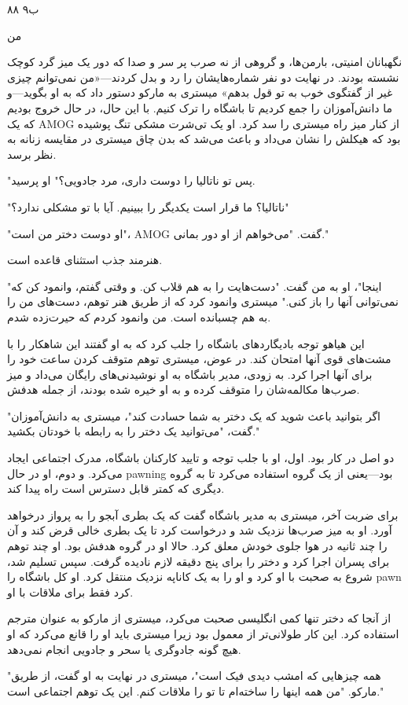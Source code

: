 ۸۸ ب۹

من

نگهبانان امنیتی، بارمن‌ها، و گروهی از نه صرب پر سر و صدا که دور یک میز گرد کوچک نشسته بودند. در نهایت دو نفر شماره‌هایشان را رد و بدل کردند—«من نمی‌توانم چیزی غیر از گفتگوی خوب به تو قول بدهم» میستری به مارکو دستور داد که به او بگوید—و ما دانش‌آموزان را جمع کردیم تا باشگاه را ترک کنیم. با این حال، در حال خروج بودیم که یک AMOG از کنار میز راه میستری را سد کرد. او یک تی‌شرت مشکی تنگ پوشیده بود که هیکلش را نشان می‌داد و باعث می‌شد که بدن چاق میستری در مقایسه زنانه به نظر برسد.

"پس تو ناتالیا را دوست داری، مرد جادویی؟" او پرسید.

"ناتالیا؟ ما قرار است یکدیگر را ببینیم. آیا با تو مشکلی ندارد؟"

"او دوست دختر من است"، AMOG گفت. "می‌خواهم از او دور بمانی."

هنرمند جذب استثنای قاعده است.

"اینجا"، او به من گفت. "دست‌هایت را به هم قلاب کن. و وقتی گفتم، وانمود کن که نمی‌توانی آنها را باز کنی." میستری وانمود کرد که از طریق هنر توهم، دست‌های من را به هم چسبانده است. من وانمود کردم که حیرت‌زده شدم.

این هیاهو توجه بادیگاردهای باشگاه را جلب کرد که به او گفتند این شاهکار را با مشت‌های قوی آنها امتحان کند. در عوض، میستری توهم متوقف کردن ساعت خود را برای آنها اجرا کرد. به زودی، مدیر باشگاه به او نوشیدنی‌های رایگان می‌داد و میز صرب‌ها مکالمه‌شان را متوقف کرده و به او خیره شده بودند، از جمله هدفش.

"اگر بتوانید باعث شوید که یک دختر به شما حسادت کند"، میستری به دانش‌آموزان گفت، "می‌توانید یک دختر را به رابطه با خودتان بکشید."

دو اصل در کار بود. اول، او با جلب توجه و تایید کارکنان باشگاه، مدرک اجتماعی ایجاد می‌کرد. و دوم، او در حال pawning بود—یعنی از یک گروه استفاده می‌کرد تا به گروه دیگری که کمتر قابل دسترس است راه پیدا کند.

برای ضربت آخر، میستری به مدیر باشگاه گفت که یک بطری آبجو را به پرواز درخواهد آورد. او به میز صرب‌ها نزدیک شد و درخواست کرد تا یک بطری خالی قرض کند و آن را چند ثانیه در هوا جلوی خودش معلق کرد. حالا او در گروه هدفش بود. او چند توهم برای پسران اجرا کرد و دختر را برای پنج دقیقه لازم نادیده گرفت. سپس تسلیم شد، شروع به صحبت با او کرد و او را به یک کاناپه نزدیک منتقل کرد. او کل باشگاه را pawn کرد فقط برای ملاقات با او.

از آنجا که دختر تنها کمی انگلیسی صحبت می‌کرد، میستری از مارکو به عنوان مترجم استفاده کرد. این کار طولانی‌تر از معمول بود زیرا میستری باید او را قانع می‌کرد که او هیچ گونه جادوگری یا سحر و جادویی انجام نمی‌دهد.

"همه چیزهایی که امشب دیدی فیک است"، میستری در نهایت به او گفت، از طریق مارکو. "من همه اینها را ساخته‌ام تا تو را ملاقات کنم. این یک توهم اجتماعی است."
